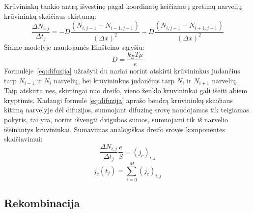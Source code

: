 Krūvininkų tankio antrą išvestinę pagal koordinatę keičiame į gretimų narvelių krūvininkų skaičiaus skirtumą:
\begin{equation} \label{eq:difuzija}
\frac{\Delta N_{i,j}}{\Delta t_j} = -D \frac{(N_{i,j-1}-N_{i-1,j-1})}{(\Delta x)^2} - D \frac{(N_{i,j-1}-N_{i+1,j-1})}{(\Delta x)^2}
\end{equation}
Šiame modelyje naudojamės Einšteino sąryšiu:
\[
	D=\frac{k_B T \mu }{e}
\]	
Formulėje~\eqref{eq:difuzija} užrašyti du nariai norint atskirti krūvininkus judančius tarp \(N_{i-1}\) ir \(N_i\) narvelių, bei krūvininkus judančius tarp \(N_i\) ir \(N_{i+1}\) narvelių. Taip atskirta nes, skirtingai nuo dreifo, vieno ženklo krūvininkai gali išeiti abiem kryptimis.
Kadangi formulė \eqref{eq:difuzija} aprašo bendrą krūvininkų skaičiaus kitimą narvelyje dėl difuzijos, sumuojant difuzinę srovę naudojamas tik teigiamas pokytis, tai yra, norint išvengti dvigubos sumos, sumuojami tik iš narvelio išeinantys krūvininkai. Sumavimas analogiškas dreifo srovės komponentės skaičiavimui:
\begin{equation}
	\frac{\Delta N_{i,j}}{\Delta t_j} \frac{e}{S}=(j_c)_{i,j}
\end{equation}
\begin{equation}
	j_c(t_j)= \sum_{i=0}^{M} (j_c)_{i,j}
\end{equation}
	
\subsection{Rekombinacija}

